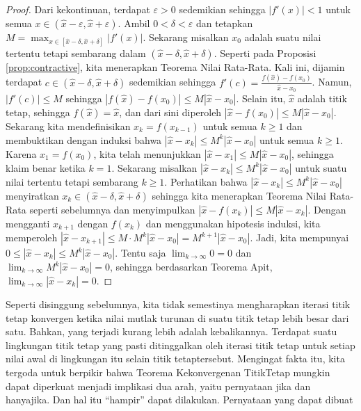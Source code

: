 \begin{proof}
Dari kekontinuan, terdapat $\varepsilon>0$ sedemikian sehingga $|f'(x)|<1$
untuk semua $x\in(\hat{x}-\varepsilon,\hat{x}+\varepsilon)$. Ambil
$0<\delta<\varepsilon$ dan tetapkan ${\displaystyle M=\max_{x\in[\hat{x}-\delta,\hat{x}+\delta]}|f'(x)|}$.
Sekarang misalkan $x_{0}$ adalah suatu nilai tertentu tetapi sembarang
dalam $(\hat{x}-\delta,\hat{x}+\delta)$. Seperti pada Proposisi \ref{prop:contractive},
kita menerapkan Teorema Nilai Rata-Rata. Kali ini, dijamin terdapat
${\displaystyle c\in(\hat{x}-\delta,\hat{x}+\delta)}$ sedemikian
sehingga $f'(c)=\frac{f(\hat{x})-f(x_{0})}{\hat{x}-x_{0}}$. Namun,
$|f'(c)|\leq M$ sehingga $|f(\hat{x})-f(x_{0})|\leq M|\hat{x}-x_{0}|$.
Selain itu, $\hat{x}$ adalah titik tetap, sehingga $f(\hat{x})=\hat{x}$,
dan dari sini diperoleh $|\hat{x}-f(x_{0})|\leq M|\hat{x}-x_{0}|$.
Sekarang kita mendefinisikan $x_{k}=f(x_{k-1})$ untuk semua $k\geq1$
dan membuktikan dengan induksi bahwa $|\hat{x}-x_{k}|\leq M^{k}|\hat{x}-x_{0}|$
untuk semua $k\geq1$. Karena $x_{1}=f(x_{0})$, kita telah menunjukkan
$|\hat{x}-x_{1}|\leq M|\hat{x}-x_{0}|$, sehingga klaim benar ketika
$k=1$. Sekarang misalkan $|\hat{x}-x_{k}|\leq M^{k}|\hat{x}-x_{0}|$
untuk suatu nilai tertentu tetapi sembarang $k\geq1$. Perhatikan
bahwa $|\hat{x}-x_{k}|\leq M^{k}|\hat{x}-x_{0}|$ menyiratkan $x_{k}\in(\hat{x}-\delta,\hat{x}+\delta)$
sehingga kita menerapkan Teorema Nilai Rata-Rata seperti sebelumnya
dan menyimpulkan $|\hat{x}-f(x_{k})|\leq M|\hat{x}-x_{k}|$. Dengan
mengganti $x_{k+1}$ dengan $f(x_{k})$ dan menggunakan hipotesis
induksi, kita memperoleh $|\hat{x}-x_{k+1}|\leq M\cdot M^{k}|\hat{x}-x_{0}|=M^{k+1}|\hat{x}-x_{0}|$.
Jadi, kita mempunyai $0\leq|\hat{x}-x_{k}|\leq M^{k}|\hat{x}-x_{0}|$.
Tentu saja ${\displaystyle \lim_{k\to\infty}0=0}$ dan ${\displaystyle \lim_{k\to\infty}M^{k}|\hat{x}-x_{0}|=0}$,
sehingga berdasarkan Teorema Apit, ${\displaystyle \lim_{k\to\infty}|\hat{x}-x_{k}|=0}$.
\end{proof}
Seperti disinggung sebelumnya, kita tidak semestinya mengharapkan
iterasi titik tetap konvergen ketika nilai mutlak turunan di suatu
titik tetap lebih besar dari satu. Bahkan, yang terjadi kurang lebih
adalah kebalikannya. Terdapat suatu lingkungan titik tetap yang pasti
ditinggalkan oleh iterasi titik tetap untuk setiap nilai awal di lingkungan
itu selain titik tetaptersebut. Mengingat fakta itu, kita tergoda
untuk berpikir bahwa Teorema Kekonvergenan TitikTetap mungkin dapat
diperkuat menjadi implikasi dua arah, yaitu pernyataan jika dan hanyajika.
Dan hal itu ``hampir'' dapat dilakukan. Pernyataan yang dapat dibuat
